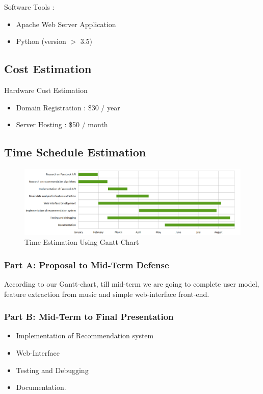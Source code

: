 \documentclass[a4paper,12pt]{article}
\begin{document}
Software Tools :
\begin{itemize}
\item Apache Web Server Application
\item Python (version $>$ 3.5)
\end{itemize}

\subsection{Cost Estimation}
Hardware Cost Estimation
\begin{itemize}
\item Domain Registration : \$30 / year
\item Server Hosting : \$50 / month
\end{itemize}

\subsection{Time Schedule Estimation}
\begin{figure}[ht!]
  \includegraphics[width=450px]{figs/ganttchart.png}
  \caption{Time Estimation Using Gantt-Chart \label{fig:ganttchart}}
\end{figure}

\subsubsection{Part A: Proposal to Mid-Term Defense}
According to our Gantt-chart, till mid-term we are going to complete user model, feature extraction from music and simple web-interface front-end.
\subsubsection{Part B: Mid-Term to Final Presentation}
\begin{itemize}
\item Implementation of Recommendation system
\item Web-Interface
\item Testing and Debugging 
\item Documentation.
\end{itemize}
\end{document}
